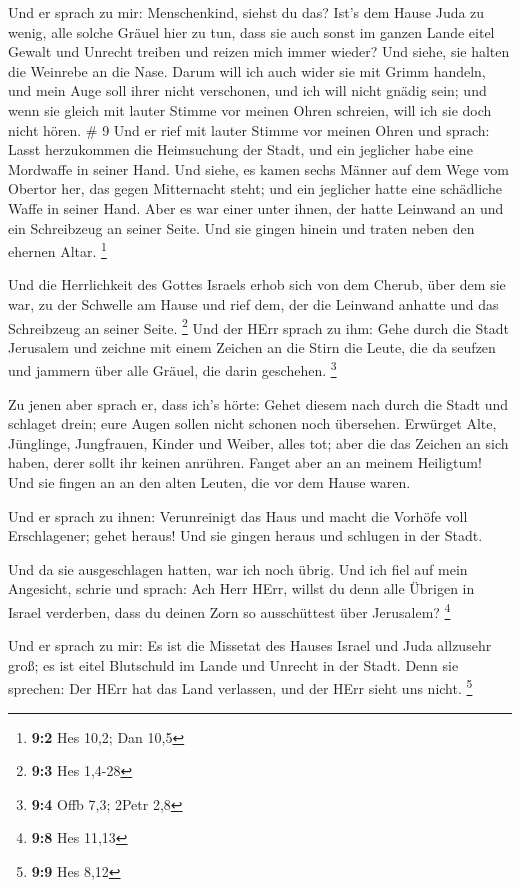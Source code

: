  Und er sprach zu mir: Menschenkind, siehst du das? Ist's
dem Hause Juda zu wenig, alle solche Gräuel hier zu tun, dass sie auch
sonst im ganzen Lande eitel Gewalt und Unrecht treiben und reizen mich
immer wieder? Und siehe, sie halten die Weinrebe an die Nase.
 Darum will ich auch wider sie mit Grimm handeln, und mein
Auge soll ihrer nicht verschonen, und ich will nicht gnädig sein; und
wenn sie gleich mit lauter Stimme vor meinen Ohren schreien, will ich
sie doch nicht hören. \# 9  Und er rief mit lauter Stimme
vor meinen Ohren und sprach: Lasst herzukommen die Heimsuchung der
Stadt, und ein jeglicher habe eine Mordwaffe in seiner Hand.
 Und siehe, es kamen sechs Männer auf dem Wege vom Obertor
her, das gegen Mitternacht steht; und ein jeglicher hatte eine
schädliche Waffe in seiner Hand. Aber es war einer unter ihnen, der
hatte Leinwand an und ein Schreibzeug an seiner Seite. Und sie gingen
hinein und traten neben den ehernen Altar. \footnote{\textbf{9:2} Hes
  10,2; Dan 10,5}

 Und die Herrlichkeit des Gottes Israels erhob sich von dem
Cherub, über dem sie war, zu der Schwelle am Hause und rief dem, der die
Leinwand anhatte und das Schreibzeug an seiner Seite. \footnote{\textbf{9:3}
  Hes 1,4-28}  Und der HErr sprach zu ihm: Gehe durch die
Stadt Jerusalem und zeichne mit einem Zeichen an die Stirn die Leute,
die da seufzen und jammern über alle Gräuel, die darin geschehen.
\footnote{\textbf{9:4} Offb 7,3; 2Petr 2,8}

 Zu jenen aber sprach er, dass ich's hörte: Gehet diesem
nach durch die Stadt und schlaget drein; eure Augen sollen nicht schonen
noch übersehen.  Erwürget Alte, Jünglinge, Jungfrauen,
Kinder und Weiber, alles tot; aber die das Zeichen an sich haben, derer
sollt ihr keinen anrühren. Fanget aber an an meinem Heiligtum! Und sie
fingen an an den alten Leuten, die vor dem Hause waren.

 Und er sprach zu ihnen: Verunreinigt das Haus und macht die
Vorhöfe voll Erschlagener; gehet heraus! Und sie gingen heraus und
schlugen in der Stadt.

 Und da sie ausgeschlagen hatten, war ich noch übrig. Und
ich fiel auf mein Angesicht, schrie und sprach: Ach Herr HErr, willst du
denn alle Übrigen in Israel verderben, dass du deinen Zorn so
ausschüttest über Jerusalem? \footnote{\textbf{9:8} Hes 11,13}

 Und er sprach zu mir: Es ist die Missetat des Hauses Israel
und Juda allzusehr groß; es ist eitel Blutschuld im Lande und Unrecht in
der Stadt. Denn sie sprechen: Der HErr hat das Land verlassen, und der
HErr sieht uns nicht. \footnote{\textbf{9:9} Hes 8,12}

